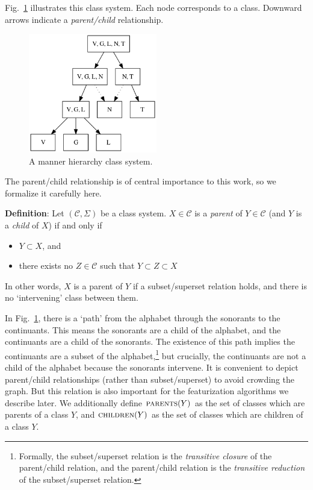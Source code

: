 \documentclass[11pt, oneside]{article}   	%
\begin{document}
\noindent Fig.~\ref{fig:manner_input} illustrates this class system. Each node corresponds to a class. Downward arrows indicate a \textit{parent/child} relationship.

\begin{figure}[h]
  \centering
  \includegraphics[width=0.5\textwidth]{manner_poset_privative.png}
  \caption{A manner hierarchy class system.}
  \label{fig:manner_input}
\end{figure}

\vspace{\baselineskip} \noindent The parent/child relationship is of central importance to this work, so we formalize it carefully here.

\vspace{\baselineskip} \noindent \textbf{Definition}: Let $(\mathcal C, \Sigma)$ be a class system. $X \in \mathcal C$ is a \textit{parent} of $Y \in \mathcal C$ (and $Y$ is a \textit{child} of $X$) if and only if \begin{itemize}
    \item $Y \subset X$, and
    \item there exists no $Z \in \mathcal C$ such that $Y \subset Z \subset X$
    \end{itemize}
In other words, $X$ is a parent of $Y$ if a subset/superset relation holds, and there is no `intervening' class between them. 

In Fig.~\ref{fig:manner_input}, there is a `path' from the alphabet through the sonorants to the continuants. This means the sonorants are a child of the alphabet, and the continuants are a child of the sonorants. The existence of this path implies the continuants are a subset of the alphabet,\footnote{Formally, the subset/superset relation is the \textit{transitive closure} of the parent/child relation, and the parent/child relation is the \textit{transitive reduction} of the subset/superset relation.} but crucially, the continuants are not a child of the alphabet because the sonorants intervene. It is convenient to depict parent/child relationships (rather than subset/superset) to avoid crowding the graph. But this relation is also important for the featurization algorithms we describe later. We additionally define $\textsc{parents}(Y)$ as the set of classes which are parents of a class $Y$, and $\textsc{children}(Y)$ as the set of classes which are children of a class $Y$.
\end{document}
